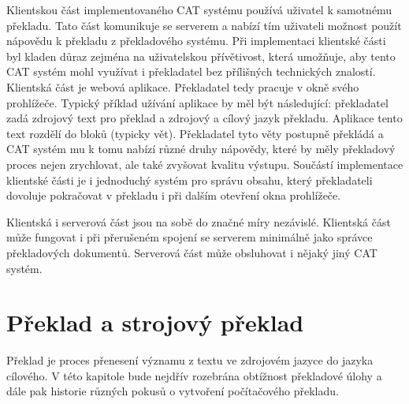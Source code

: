 \documentclass[12pt,a4paper]{report}
\begin{document}


Klientskou část implementovaného CAT systému používá uživatel k samotnému překladu. Tato část komunikuje se serverem a nabízí tím uživateli možnost použít nápovědu k překladu z překladového systému. Při implementaci klientské části byl kladen důraz zejména na uživatelskou přívětivost, která umožňuje, aby tento CAT systém mohl využívat i překladatel bez přílišných technických znalostí. Klientská část je webová aplikace. Překladatel tedy pracuje v okně svého prohlížeče. Typický příklad užívání aplikace by měl být následující: překladatel zadá zdrojový text pro překlad a zdrojový a cílový jazyk překladu. Aplikace tento text rozdělí do bloků (typicky vět). Překladatel tyto věty postupně překládá a CAT systém mu k tomu nabízí různé druhy nápovědy, které by měly překladový proces nejen zrychlovat, ale také zvyšovat kvalitu výstupu. Součástí implementace klientské části je i jednoduchý systém pro správu obsahu, který překladateli dovoluje pokračovat v překladu i při dalším otevření okna prohlížeče.

Klientská i serverová část jsou na sobě do značné míry nezávislé. Klientská část může fungovat i při přerušeném spojení se serverem minimálně jako správce překladových dokumentů. Serverová část může obsluhovat i nějaký jiný CAT systém.

\chapter{Překlad a strojový překlad}

Překlad je proces přenesení významu z textu ve zdrojovém jazyce do jazyka cílového. V této kapitole bude nejdřív rozebrána obtížnost překladové úlohy a dále pak historie různých pokusů o vytvoření počítačového překladu.
\end{document}
